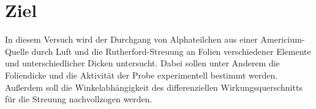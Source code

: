 \section{Ziel}
\label{sec:Ziel}
In diesem Versuch wird der Durchgang von Alphateilchen aus einer Americium-Quelle durch Luft und die Rutherford-Streuung an Folien verschiedener Elemente und unterschiedlicher Dicken untersucht. Dabei sollen unter Anderem die Foliendicke und die Aktivität der Probe experimentell bestimmt werden. Außerdem soll die Winkelabhängigkeit des differenziellen Wirkungsquerschnitts für die Streuung nachvollzogen werden.
